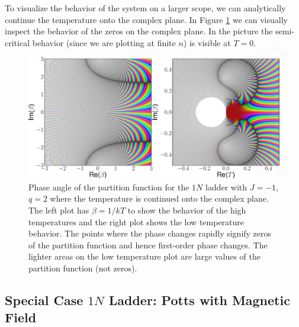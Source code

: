 To visualize the behavior of the system on a larger scope, we can analytically continue the temperature onto the complex plane. In Figure \ref{fig:zeros_par_func_1n_ladder_no_field} we can visually inspect the behavior of the zeros on the complex plane. In the picture the semi-critical behavior (since we are plotting at finite $n$) is visible at $T=0$.

\begin{figure}[ht]
\includegraphics[width=\textwidth]{pictures/aggregation_model/pictures/zeros_parition_func_1N_ladder_2.pdf}
\caption{
Phase angle of the partition function for the $1N$ ladder with $J=-1$, $q=2$ where the temperature is continued onto the complex plane. The left plot has $\beta=1/kT$ to show the behavior of the high temperatures and the right plot shows the low temperature behavior. The points where the phase changes rapidly signify zeros of the partition function and hence first-order phase changes. The lighter areas on the low temperature plot are large values of the partition function (not zeros).
}
\label{fig:zeros_par_func_1n_ladder_no_field}
\end{figure}


\subsection{Special Case \texorpdfstring{$1N$}{1N} Ladder: Potts with Magnetic Field}

